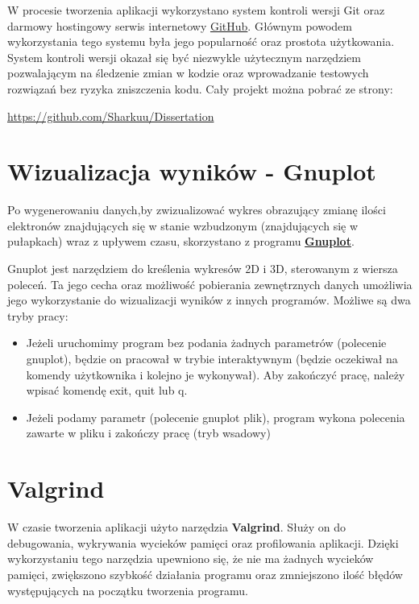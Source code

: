 W procesie tworzenia aplikacji wykorzystano system kontroli wersji Git oraz darmowy hostingowy serwis internetowy \href{https://github.com/}{GitHub}.
Głównym powodem wykorzystania tego systemu była jego popularność oraz prostota użytkowania.
System kontroli wersji okazał się być niezwykle użytecznym narzędziem pozwalającym na
śledzenie zmian w kodzie oraz wprowadzanie testowych rozwiązań bez
ryzyka zniszczenia kodu. Cały projekt można pobrać ze strony:
\begin{center}
\url{https://github.com/Sharkuu/Dissertation}
\end{center}

\section{Wizualizacja wyników - Gnuplot}

Po wygenerowaniu danych,by zwizualizować wykres obrazujący zmianę ilości elektronów znajdujących się w stanie wzbudzonym (znajdujących się w pułapkach) wraz z upływem czasu, skorzystano z programu \href{http://www.gnuplot.info/}{\textbf{Gnuplot}}.

Gnuplot jest narzędziem do kreślenia wykresów 2D i 3D, sterowanym z wiersza poleceń. Ta jego cecha oraz możliwość pobierania zewnętrznych danych umożliwia jego wykorzystanie do wizualizacji wyników z innych programów. Możliwe są dwa tryby pracy:
\begin{itemize}
\item Jeżeli uruchomimy program bez podania żadnych parametrów (polecenie gnuplot), będzie on pracował w trybie interaktywnym (będzie oczekiwał na komendy użytkownika i kolejno je wykonywał). Aby zakończyć pracę, należy wpisać komendę exit, quit lub q.
\item Jeżeli podamy parametr (polecenie gnuplot plik), program wykona polecenia zawarte w pliku i zakończy pracę (tryb wsadowy)
\end{itemize}

\section{Valgrind}
W czasie tworzenia aplikacji użyto narzędzia \textbf{Valgrind}. Służy on do debugowania, wykrywania wycieków pamięci oraz profilowania aplikacji. Dzięki wykorzystaniu tego narzędzia upewniono się, że nie ma żadnych wycieków pamięci, zwiększono szybkość działania programu oraz zmniejszono ilość błędów występujących na początku tworzenia programu.